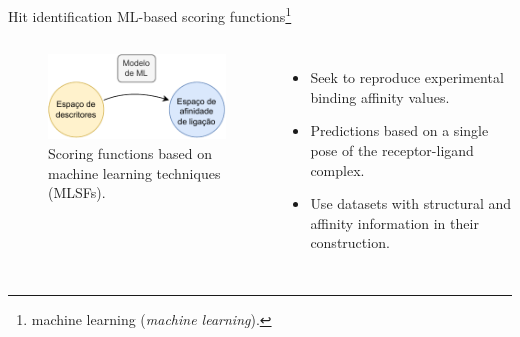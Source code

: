 \documentclass[aspectratio=169,xcolor=dvipsnames]{beamer}
\begin{document}
\begin{frame}{Hit identification \hfill {\normalsize ML-based scoring functions\footnote{machine learning (\textit{machine learning}).}}}
    \begin{columns}[c]
        \begin{figure}
            \centering
            \includegraphics[width=.81\linewidth]{imgs/mlsf.pdf}
            \caption{Scoring functions based on machine learning techniques (MLSFs).}
        \end{figure}

        \begin{itemize}
            \item Seek to reproduce experimental binding affinity values.
            \item Predictions based on a single pose of the receptor-ligand complex.
            \item Use datasets with structural and affinity information in their construction.
        \end{itemize}
    \end{columns}
\end{frame}
\end{document}
